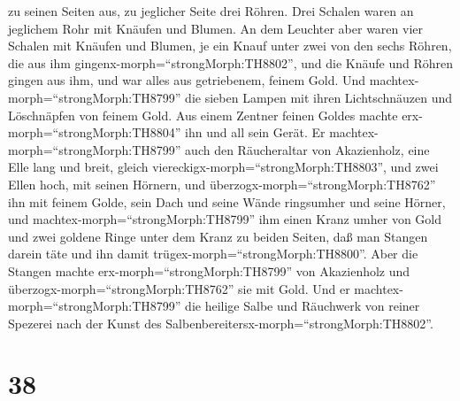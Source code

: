 zu seinen Seiten aus, zu jeglicher Seite drei Röhren.  Drei
Schalen waren an jeglichem Rohr mit Knäufen und Blumen.  An
dem Leuchter aber waren vier Schalen mit Knäufen und Blumen,
 je ein Knauf unter zwei von den sechs Röhren, die aus ihm
gingenx-morph=``strongMorph:TH8802'',  und die Knäufe und
Röhren gingen aus ihm, und war alles aus getriebenem, feinem Gold.
 Und machtex-morph=``strongMorph:TH8799'' die sieben Lampen
mit ihren Lichtschnäuzen und Löschnäpfen von feinem Gold. 
Aus einem Zentner feinen Goldes machte erx-morph=``strongMorph:TH8804''
ihn und all sein Gerät.  Er
machtex-morph=``strongMorph:TH8799'' auch den Räucheraltar von
Akazienholz, eine Elle lang und breit, gleich
viereckigx-morph=``strongMorph:TH8803'', und zwei Ellen hoch, mit seinen
Hörnern,  und überzogx-morph=``strongMorph:TH8762'' ihn mit
feinem Golde, sein Dach und seine Wände ringsumher und seine Hörner, und
machtex-morph=``strongMorph:TH8799'' ihm einen Kranz umher von Gold
 und zwei goldene Ringe unter dem Kranz zu beiden Seiten,
daß man Stangen darein täte und ihn damit
trügex-morph=``strongMorph:TH8800''.  Aber die Stangen
machte erx-morph=``strongMorph:TH8799'' von Akazienholz und
überzogx-morph=``strongMorph:TH8762'' sie mit Gold.  Und er
machtex-morph=``strongMorph:TH8799'' die heilige Salbe und Räuchwerk von
reiner Spezerei nach der Kunst des
Salbenbereitersx-morph=``strongMorph:TH8802''.

\hypertarget{section-37}{%
\section{38}\label{section-37}}

